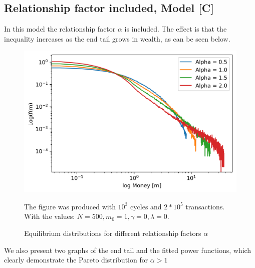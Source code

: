 \documentclass[a4paper,11pt]{article}
\begin{document}
	\subsection{Relationship factor included, Model [C]}
In this model the relationship factor $\alpha$ is included. The effect is that the inequality increases as the end tail grows in wealth, as can be seen below.
	
\begin{figure}[H]
	\includegraphics[scale=1]{figures/relationship_1000c_200000t.png} 
	\caption{Equilibrium distributions for different relationship factors $\alpha$}
{\small The figure was produced with $10^3$ cycles and $2*10^5$ transactions. \\With the values: $N = 500, m_0 = 1, \gamma = 0, \lambda = 0$. }
\end{figure}

We also present two graphs of the end tail and the fitted power functions, which clearly demonstrate the Pareto distribution for $\alpha>1$
\end{document}
